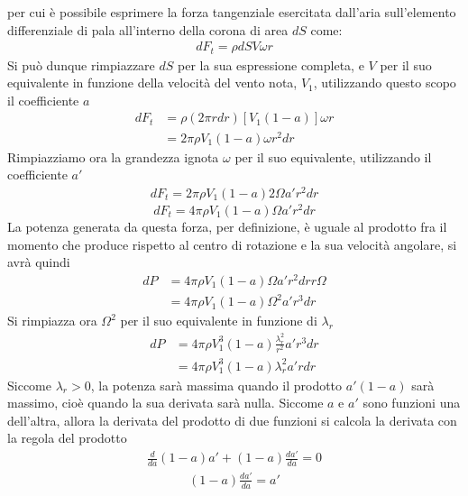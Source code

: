 per cui è possibile esprimere la forza tangenziale esercitata dall'aria sull'elemento differenziale di pala all'interno della corona di area $dS$ come:
\begin{align*}
dF_t = \rho dS V \omega r
\end{align*}
Si può dunque rimpiazzare $dS$ per la sua espressione completa, e $V$ per il suo equivalente in funzione della velocità del vento nota, $V_1$, utilizzando questo scopo il coefficiente $a$
\begin{align*}
dF_t &= \rho \left( 2 \pi r dr \right) \left[ V_1 \left(1 -a \right) \right] \omega r\\
& = 2 \pi \rho V_1 \left( 1-a \right) \omega r^2 dr
\end{align*}
Rimpiazziamo ora la grandezza ignota $\omega$ per il suo equivalente, utilizzando il coefficiente $a'$
\begin{align*}
dF_t = 2 \pi \rho V_1 \left( 1- a \right) 2 \Omega a' r^2 dr
\end{align*}
\begin{equation}\label{eq:dftfin}
dF_t = 4 \pi \rho V_1 \left(1-a \right) \Omega a' r^2 dr
\end{equation}
La potenza generata da questa forza, per definizione, è uguale al prodotto fra il momento che produce rispetto al centro di rotazione e la sua velocità angolare, si avrà quindi
\begin{align*}
dP &= 4 \pi \rho V_1 \left( 1-a \right) \Omega a' r^2 dr r \Omega \\
&= 4 \pi \rho V_1 \left( 1-a \right) \Omega^2 a' r^3 dr
\end{align*}
Si rimpiazza ora $\Omega^2$ per il suo equivalente in funzione di $\lambda_r$
\begin{align*}
dP &= 4 \pi \rho V_1^3 \left( 1- a \right) \frac{\lambda_r^2}{r^2} a' r^3 dr\\
&= 4 \pi \rho V_1^3 \left( 1 - a \right) \lambda_r^2 a' r dr
\end{align*}
Siccome $\lambda_r > 0$, la potenza sarà massima quando il prodotto $a' \left( 1- a \right)$ sarà massimo, cioè quando la sua derivata sarà nulla. Siccome $a$ e $a'$ sono funzioni una dell'altra, allora la derivata del prodotto di due funzioni si calcola la derivata con la regola del prodotto
\begin{align*}
\frac{d}{da} \left( 1-a \right) a' + \left( 1 -a \right) \frac{da'}{da} = 0
\end{align*}
\begin{align*}
\left( 1- a \right) \frac{da'}{da} = a'
\end{align*}
